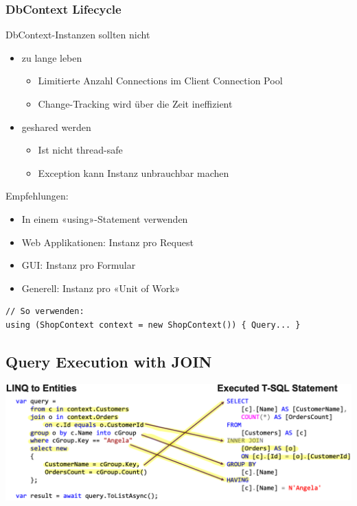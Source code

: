 \subsubsection{DbContext Lifecycle}
DbContext-Instanzen sollten nicht
\begin{itemize}
    \item zu lange leben
    \begin{itemize}
        \item Limitierte Anzahl Connections im Client Connection Pool
        \item Change-Tracking wird über die Zeit ineffizient
    \end{itemize}
    \item geshared werden
    \begin{itemize}
        \item Ist nicht thread-safe
        \item Exception kann Instanz unbrauchbar machen
    \end{itemize}
\end{itemize}

Empfehlungen:
\begin{itemize}
    \item In einem «using»-Statement verwenden
    \item Web Applikationen: Instanz pro Request
    \item GUI: Instanz pro Formular
    \item Generell: Instanz pro «Unit of Work»
\end{itemize}
\begin{lstlisting}
// So verwenden:
using (ShopContext context = new ShopContext()) { Query... }
\end{lstlisting}


\subsection{Query Execution with JOIN}
\begin{center}
    \includegraphics[scale=.35]{graphic/efc/join.png}
\end{center}
\vspace{-8pt}

